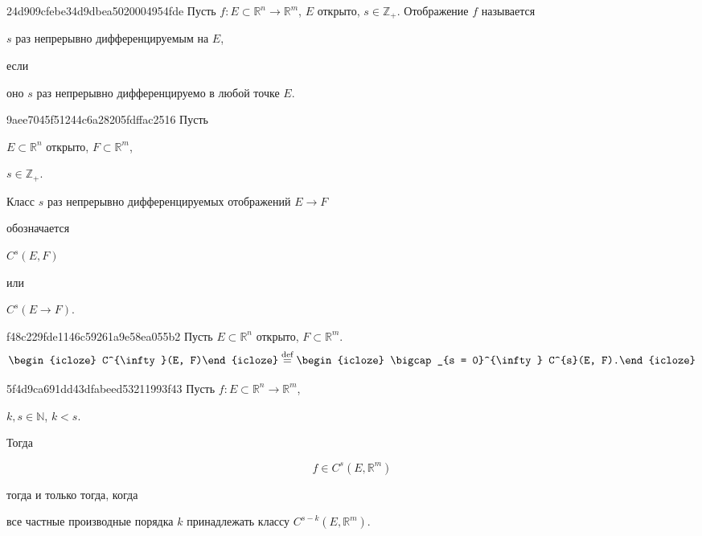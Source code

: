 \begin{note}{24d909cfebe34d9dbea5020004954fde}
    Пусть \({  f : E \subset \mathbb R^{n} \to \mathbb R^{m} }\),\: \({ E }\) открыто,\: \({ s \in \mathbb Z_+ }\).
    Отображение \({ f }\) называется \begin{icloze}{2}\({ s }\) раз непрерывно дифференцируемым на \({ E }\),\end{icloze} если \begin{icloze}{1}оно \({ s }\) раз непрерывно дифференцируемо в любой точке \({ E }\).\end{icloze}
\end{note}

\begin{note}{9aee7045f51244c6a28205fdffac2516}
    Пусть \begin{icloze}{3}\({ E \subset \mathbb R^{n} }\) открыто,\: \({ F \subset \mathbb R^{m} }\),\end{icloze}\: \begin{icloze}{3}\({ s \in \mathbb Z_+ }\).\end{icloze} \begin{icloze}{2}Класс \({ s }\) раз непрерывно дифференцируемых отображений \({ E \to F }\)\end{icloze} обозначается
    \begin{center}
        \begin{icloze}{1}\({ C^{s}(E, F) }\)\end{icloze} или \begin{icloze}{1}\({ C^{s}(E \to F) }\).\end{icloze}
    \end{center}
\end{note}

\begin{note}{f48c229fde1146c59261a9e58ea055b2}
    Пусть \({ E \subset \mathbb R^{n} }\) открыто,\: \({ F \subset \mathbb R^{m} }\).
    \[
        \begin{icloze}{2}C^{\infty}(E, F)\end{icloze} \overset{\text{def}}= \begin{icloze}{1}\bigcap_{s = 0}^{\infty} C^{s}(E, F).\end{icloze}
    \]
\end{note}

\begin{note}{5f4d9ca691dd43dfabeed53211993f43}
    Пусть \({ f : E \subset \mathbb R^{n} \to \mathbb R^{m} }\),\: \begin{icloze}{4}\({ k, s \in \mathbb N }\),\: \({ k < s }\).\end{icloze}
    Тогда
    \begin{icloze}{2}
        \[
            f \in C^{s}(E, \mathbb R^{m})
        \]
    \end{icloze}
    \begin{icloze}{3}тогда и только тогда, когда\end{icloze} \begin{icloze}{1}все частные производные порядка \({ k }\) принадлежать классу \({ C^{s - k}(E, \mathbb R^{m}) }\).\end{icloze}
\end{note}


